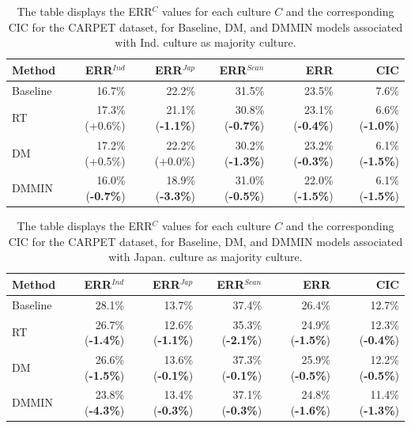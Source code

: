 %
\begin{table} [H]
\centering
\begin{tabular}{lrrrrr}
\toprule
\textbf{Method} & \textbf{ERR$^{Ind}$} & \textbf{ERR$^{Jap}$} & \textbf{ERR$^{Scan}$} & \textbf{ERR} & \textbf{CIC} \\
\midrule
Baseline     & 16.7\% & 22.2\% & 31.5\% & 23.5\% & 7.6\% \\
RT           & 17.3\% (+0.6\%) & 21.1\% (\textbf{-1.1\%}) & 30.8\% (\textbf{-0.7\%}) & 23.1\% (\textbf{-0.4\%}) & 6.6\% (\textbf{-1.0\%}) \\
DM           & 17.2\% (+0.5\%) & 22.2\% (+0.0\%) & 30.2\% (\textbf{-1.3\%}) & 23.2\% (\textbf{-0.3\%}) & 6.1\% (\textbf{-1.5\%}) \\
DMMIN        & 16.0\% (\textbf{-0.7\%}) & 18.9\% (\textbf{-3.3\%}) & 31.0\% (\textbf{-0.5\%}) & 22.0\% (\textbf{-1.5\%}) & 6.1\% (\textbf{-1.5\%}) \\
\bottomrule
\end{tabular}
\caption{The table displays the ERR$^C$ values for each culture $C$ and the corresponding CIC for the CARPET dataset, for Baseline, DM, and DMMIN models associated with Ind. culture as majority culture.}
\label{ch3:tab:diffCI}
\end{table}
%
%
\begin{table} [H]
\centering
\begin{tabular}{lrrrrr}
\toprule
\textbf{Method} & \textbf{ERR$^{Ind}$} & \textbf{ERR$^{Jap}$} & \textbf{ERR$^{Scan}$} & \textbf{ERR} & \textbf{CIC} \\
\midrule						
Baseline     & 28.1\% & 13.7\% & 37.4\% & 26.4\% & 12.7\% \\
RT           & 26.7\% (\textbf{-1.4\%}) & 12.6\% (\textbf{-1.1\%}) & 35.3\% (\textbf{-2.1\%}) & 24.9\% (\textbf{-1.5\%}) & 12.3\% (\textbf{-0.4\%}) \\
DM           & 26.6\% (\textbf{-1.5\%}) & 13.6\% (\textbf{-0.1\%}) & 37.3\% (\textbf{-0.1\%}) & 25.9\% (\textbf{-0.5\%}) & 12.2\% (\textbf{-0.5\%}) \\
DMMIN        & 23.8\% (\textbf{-4.3\%}) & 13.4\% (\textbf{-0.3\%}) & 37.1\% (\textbf{-0.3\%}) & 24.8\% (\textbf{-1.6\%}) & 11.4\% (\textbf{-1.3\%}) \\
\bottomrule
\end{tabular}
\caption{The table displays the ERR$^C$ values for each culture $C$ and the corresponding CIC for the CARPET dataset, for Baseline, DM, and DMMIN models associated with Japan. culture as majority culture.}
\label{ch3:tab:diffCJ}
\end{table}
